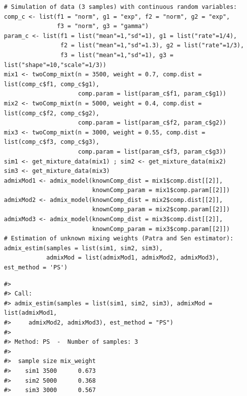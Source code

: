 \begin{verbatim}
# Simulation of data (3 samples) with continuous random variables:
comp_c <- list(f1 = "norm", g1 = "exp", f2 = "norm", g2 = "exp",
               f3 = "norm", g3 = "gamma")
param_c <- list(f1 = list("mean"=1,"sd"=1), g1 = list("rate"=1/4),
                f2 = list("mean"=1,"sd"=1.3), g2 = list("rate"=1/3),
                f3 = list("mean"=1,"sd"=1), g3 = list("shape"=10,"scale"=1/3))
mix1 <- twoComp_mixt(n = 3500, weight = 0.7, comp.dist = list(comp_c$f1, comp_c$g1),
                     comp.param = list(param_c$f1, param_c$g1))
mix2 <- twoComp_mixt(n = 5000, weight = 0.4, comp.dist = list(comp_c$f2, comp_c$g2),
                     comp.param = list(param_c$f2, param_c$g2))
mix3 <- twoComp_mixt(n = 3000, weight = 0.55, comp.dist = list(comp_c$f3, comp_c$g3),
                     comp.param = list(param_c$f3, param_c$g3))
sim1 <- get_mixture_data(mix1) ; sim2 <- get_mixture_data(mix2)
sim3 <- get_mixture_data(mix3)
admixMod1 <- admix_model(knownComp_dist = mix1$comp.dist[[2]],
                         knownComp_param = mix1$comp.param[[2]])
admixMod2 <- admix_model(knownComp_dist = mix2$comp.dist[[2]],
                         knownComp_param = mix2$comp.param[[2]])
admixMod3 <- admix_model(knownComp_dist = mix3$comp.dist[[2]],
                         knownComp_param = mix3$comp.param[[2]])
# Estimation of unknown mixing weights (Patra and Sen estimator):
admix_estim(samples = list(sim1, sim2, sim3), 
            admixMod = list(admixMod1, admixMod2, admixMod3), est_method = 'PS')
\end{verbatim}

\begin{verbatim}
#> 
#> Call:
#> admix_estim(samples = list(sim1, sim2, sim3), admixMod = list(admixMod1, 
#>     admixMod2, admixMod3), est_method = "PS")
#> 
#> Method: PS  -  Number of samples: 3 
#> 
#>  sample size mix_weight
#>    sim1 3500      0.673
#>    sim2 5000      0.368
#>    sim3 3000      0.567
\end{verbatim}

